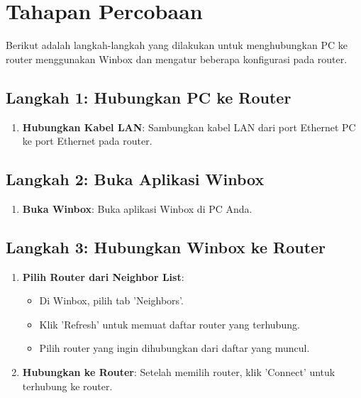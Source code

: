 \section*{Tahapan Percobaan} %

Berikut adalah langkah-langkah yang dilakukan untuk menghubungkan PC ke router menggunakan Winbox dan mengatur beberapa konfigurasi pada router.

\subsection*{Langkah 1: Hubungkan PC ke Router}
\begin{enumerate}
    \item \textbf{Hubungkan Kabel LAN}:
    Sambungkan kabel LAN dari port Ethernet PC ke port Ethernet pada router.
\end{enumerate}

\subsection*{Langkah 2: Buka Aplikasi Winbox}
\begin{enumerate}
    \item \textbf{Buka Winbox}:
    Buka aplikasi Winbox di PC Anda.
\end{enumerate}

\subsection*{Langkah 3: Hubungkan Winbox ke Router}
\begin{enumerate}
    \item \textbf{Pilih Router dari Neighbor List}:
    \begin{itemize}
        \item Di Winbox, pilih tab 'Neighbors'.
        \item Klik 'Refresh' untuk memuat daftar router yang terhubung.
        \item Pilih router yang ingin dihubungkan dari daftar yang muncul.
    \end{itemize}
    
    \item \textbf{Hubungkan ke Router}:
    Setelah memilih router, klik 'Connect' untuk terhubung ke router.
\end{enumerate}

